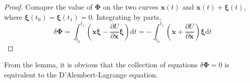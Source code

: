 \documentclass[conference]{IEEEtran}
\theoremstyle{definition}
\theoremstyle{remark}
\begin{document}
    \begin{proof}
        Comapre the value of $\bm{\Phi}$ on the two curves $\mathbf{x}(t)$ and $\mathbf{x}(t) + \bm{\xi}(t)$, where $\bm{\xi}(t_0) = \bm{\xi}(t_1) = 0$. Integrating by parts, 
        \begin{equation*}
            \delta \bm{\Phi} = \int_{t_0}^{t_1} \left( \dot{\mathbf{x}} \dot{\bm{\xi}} - \dfrac{\partial U}{\partial \mathbf{x}} \bm{\xi} \right) \mathrm{d} t = -\int_{t_0}^{t_1} \left( \ddot{\mathbf{x}} + \dfrac{\partial U}{\partial \mathbf{x}} \right) \bm{\xi} \mathrm{d} t
        \end{equation*}
    \end{proof}

    From the lemma, it is obvious that the collection of equations $\delta \bm{\Phi} = 0$ is equivalent to the D'Alembert-Lagrange equation.
\end{document}
